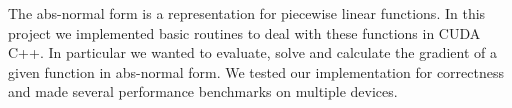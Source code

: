 The abs-normal form is a representation for piecewise linear functions.
In this project we implemented basic routines to deal with these functions in CUDA C++.
In particular we wanted to evaluate, solve and calculate the gradient of a given function in abs-normal form.
We tested our implementation for correctness and made several performance benchmarks on multiple devices.